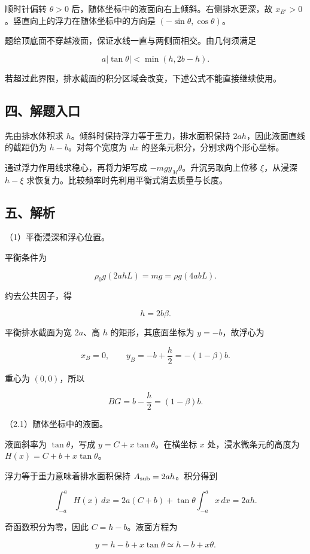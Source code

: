 \documentclass[12pt,a4paper,fontset=fandol]{ctexart}
\begin{document}
顺时针偏转 \(\theta>0\) 后，随体坐标中的液面向右上倾斜。右侧排水更深，故
\(x_{B'}>0\)。竖直向上的浮力在随体坐标中的方向是
\((-\sin\theta,\cos\theta)\)。

题给顶底面不穿越液面，保证水线一直与两侧面相交。由几何须满足

\[
a|\tan\theta|<\min(h,2b-h).
\]

若超过此界限，排水截面的积分区域会改变，下述公式不能直接继续使用。

\subsection{四、解题入口}\label{ux56dbux89e3ux9898ux5165ux53e3-4}

先由排水体积求 \(h\)。倾斜时保持浮力等于重力，排水面积保持
\(2ah\)，因此液面直线的截距仍为 \(h-b\)。对每个宽度为 \(dx\)
的竖条元积分，分别求两个形心坐标。

通过浮力作用线求稳心，再将力矩写成 \(-mgy_M\theta\)。升沉另取向上位移
\(\xi\)，从浸深 \(h-\xi\)
求恢复力。比较频率时先利用平衡式消去质量与长度。

\subsection{五、解析}\label{ux4e94ux89e3ux6790-4}

（1）平衡浸深和浮心位置。

平衡条件为

\[
\rho_0g(2ahL)=mg=\rho g(4abL).
\]

约去公共因子，得

\[
\boxed{h=2b\beta.}
\tag{5.1}
\]

平衡排水截面为宽 \(2a\)、高 \(h\) 的矩形，其底面坐标为
\(y=-b\)，故浮心为

\[
x_B=0,\qquad y_B=-b+\frac h2=-(1-\beta)b.
\]

重心为 \((0,0)\)，所以

\[
\boxed{BG=b-\frac h2=(1-\beta)b.}
\]

（2.1）随体坐标中的液面。

液面斜率为 \(\tan\theta\)，写成 \(y=C+x\tan\theta\)。在横坐标 \(x\)
处，浸水微条元的高度为 \(H(x)=C+b+x\tan\theta\)。

浮力等于重力意味着排水面积保持 \(A_{\rm sub}=2ah\)。积分得到

\[
\int_{-a}^aH(x)\,dx=2a(C+b)
+\tan\theta\int_{-a}^a x\,dx=2ah.
\]

奇函数积分为零，因此 \(C=h-b\)。液面方程为

\[
\boxed{y=h-b+x\tan\theta\simeq h-b+x\theta.}
\tag{5.2}
\]
\end{document}
